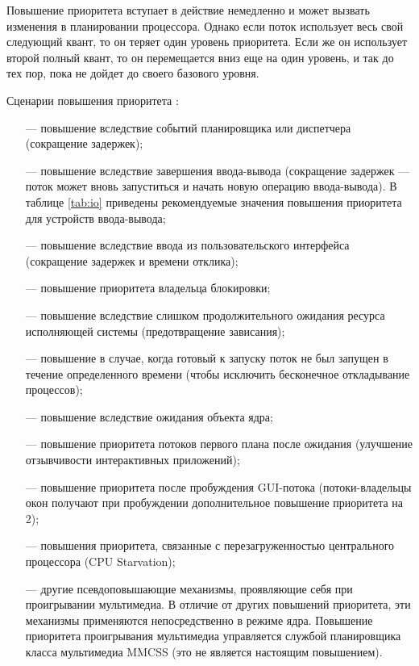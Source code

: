 Повышение приоритета вступает в действие немедленно и может вызвать изменения в планировании процессора. Однако если поток использует весь свой следующий квант, то он теряет один уровень приоритета. Если же он использует второй полный квант, то он перемещается вниз еще  на один уровень, и так до тех пор, пока не дойдет до своего базового уровня. 

Сценарии повышения приоритета \cite{win7}:
\begin{itemize}
	\item[---] повышение вследствие событий планировщика или диспетчера (сокращение задержек);
	\item[---] повышение вследствие завершения ввода-вывода (сокращение задержек --- поток может вновь запуститься и начать новую операцию ввода-вывода). В таблице \ref{tab:io} приведены рекомендуемые значения повышения приоритета для устройств ввода-вывода;
	\item[---] повышение вследствие ввода из пользовательского интерфейса (сокращение задержек и времени отклика);
	\item[---] повышение приоритета владельца блокировки;
	\item[---] повышение вследствие слишком продолжительного ожидания ресурса исполняющей системы (предотвращение зависания);
	\item[---] повышение в случае, когда готовый к запуску поток не был запущен в течение определенного времени (чтобы исключить бесконечное откладывание процессов);
	\item[---] повышение вследствие ожидания объекта ядра;
	\item[---] повышение приоритета потоков первого плана после ожидания (улучшение отзывчивости интерактивных приложений);
	\item[---] повышение приоритета после пробуждения GUI-потока (потоки-владельцы окон получают при пробуждении дополнительное повышение приоритета на 2);
	\item[---] повышения приоритета, связанные с перезагруженностью центрального процессора (CPU Starvation);
	\item[---] другие псевдоповышающие 	механизмы, проявляющие себя при проигрывании мультимедиа. В отличие от других повышений приоритета, эти механизмы применяются непосредственно в режиме ядра. Повышение приоритета проигрывания мультимедиа управляется службой планировщика класса мультимедиа MMCSS (это не является настоящим повышением).
\end{itemize}

